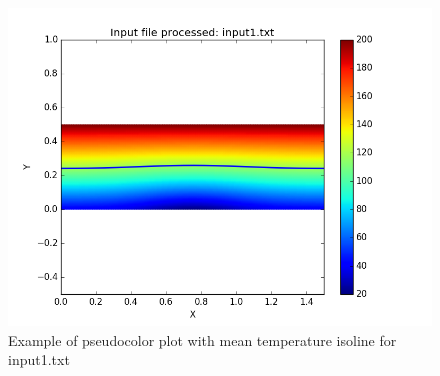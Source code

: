 \documentclass{article}
\begin{document}
\begin{figure}[h]
\centering
\includegraphics[scale=0.6]{pcolor1.png}
\caption{Example of pseudocolor plot with mean temperature isoline for input1.txt}
\label{fig:pcolor1}
\end{figure}



\end{document}

